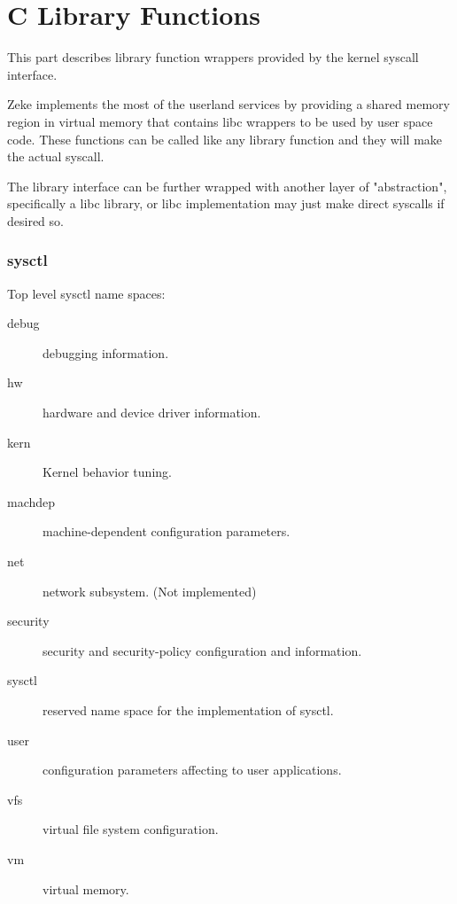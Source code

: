 \part{C Library Functions}

This part describes library function wrappers provided by the kernel syscall
interface.

Zeke implements the most of the userland services by providing a shared memory
region in virtual memory that contains libc wrappers to be used by user space
code. These functions can be called like any library function and they will
make the actual syscall.

The library interface can be further wrapped with another layer of
"abstraction", specifically a libc library, or libc implementation may just
make direct syscalls if desired so.

\section{sysctl}

Top level sysctl name spaces:

\begin{description}
\item[debug]    debugging information.
\item[hw]       hardware and device driver information.
\item[kern]     Kernel behavior tuning.
\item[machdep]  machine-dependent configuration parameters.
\item[net]      network subsystem. (Not implemented)
\item[security] security and security-policy configuration and information.
\item[sysctl]   reserved name space for the implementation of sysctl.
\item[user]     configuration parameters affecting to user applications.
\item[vfs]      virtual file system configuration.
\item[vm]       virtual memory.
\end{description}
